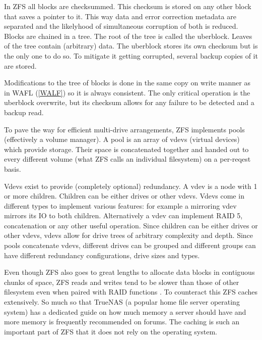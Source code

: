             In ZFS all blocks are checksummed. This checksum is stored on any
            other block that saves a pointer to it. This way data and error
            correction metadata are separated and the likelyhood of
            simultaneous corruption of both is reduced. Blocks are chained in a
            tree. The root of the tree is called the uberblock. Leaves of the
            tree contain (arbitrary) data. The uberblock stores its own
            checksum but is the only one to do so. To mitigate it getting
            corrupted, several backup copies of it are stored.

            Modifications to the tree of blocks is done in the same copy on
            write manner as in WAFL (\ref{WALF}) so it is always consistent.
            The only critical operation is the uberblock overwrite, but its
            checksum allows for any failure to be detected and a backup read.

            To pave the way for efficient multi-drive arrangements, ZFS
            implements pools (effectively a volume manager). A pool is an array
            of vdevs (virtual devices) which provide storage. Their space is
            concatenated together and handed out to every different volume
            (what ZFS calls an individual filesystem) on a per-reqest basis.

            Vdevs exist to provide (completely optional) redundancy. A vdev is
            a node with 1 or more children. Children can be either drives or
            other vdevs. Vdevs come in different types to implement various
            features: for example a mirroring vdev mirrors its IO to both
            children. Alternatively a vdev can implement RAID 5, concatenation
            or any other useful operation. Since children can be either drives
            or other vdevs, vdevs allow for drive trees of arbitrary complexity
            and depth. Since pools concatenate vdevs, different drives can be
            grouped and different groups can have different redundancy
            configurations, drive sizes and types.

            Even though ZFS also goes to great lengths to allocate data blocks
            in contiguous chunks of space, ZFS reads and writes tend to be
            slower than those of other filesystem even when paired with RAID
            functions \cite{i'm pretty sure someone somewhere said this}. To
            counteract this ZFS caches extensively. So much so that TrueNAS (a
            popular home file server operating system) has a dedicated guide on
            how much memory a server should have
            and more memory is frequently recommended on forums. The caching is
            such an important part of ZFS that it does not rely on the
            operating system.

